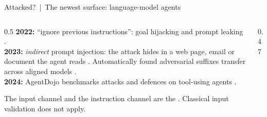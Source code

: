 \documentclass[aspectratio=169,10pt]{beamer}
\begin{document}
\begin{frame}{Attacked? \,|\, The newest surface: language-model agents}
\begin{columns}[T]
\begin{column}{0.5\textwidth}
{\footnotesize
\textbf{2022:} ``ignore previous instructions'': goal hijacking and prompt leaking .\\[3pt]
\textbf{2023:} \emph{indirect} prompt injection: the attack hides in a web page, email or document the agent reads . Automatically found adversarial suffixes transfer across aligned models .\\[3pt]
\textbf{2024:} AgentDojo benchmarks attacks and defences on tool-using agents .}

\vspace{2mm}
{\footnotesize The input channel and the instruction channel are the . Classical input validation does not apply.}
\end{column}
\begin{column}{0.47\textwidth}
\begin{sfig}[0.62]
\end{sfig}
\end{column}
\end{columns}
\end{frame}
\end{document}
